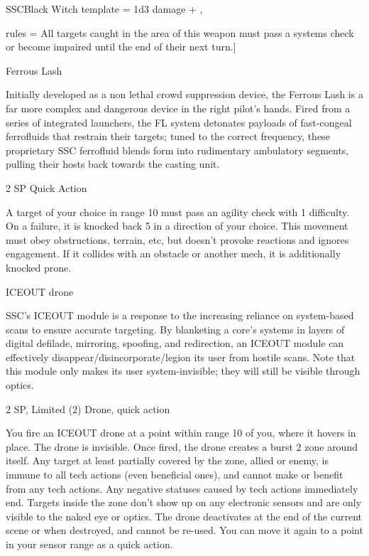 \begin{mech}{SSC}{Black Witch}
template = {\Main \Cannon \linebreak
{} \linebreak
{} \linebreak
1d3 \energy damage + },

rules = {All targets caught in the area of this weapon must pass a systems check or become impaired until the end of their next turn.}]


Ferrous Lash

Initially developed as a non lethal crowd suppression device, the Ferrous Lash is a far more complex and dangerous device in the right pilot's hands. Fired from a series of integrated launchers, the FL system detonates payloads of fast-congeal ferrofluids that restrain their targets; tuned to the correct frequency, these proprietary SSC ferrofluid blends form into rudimentary ambulatory segments, pulling their hosts back towards the casting unit.

2 SP
Quick Action

A target of your choice in range 10 must pass an agility check with 1 difficulty. On a failure, it is knocked back 5 in a direction of your choice. This movement must obey obstructions, terrain, etc, but doesn't provoke reactions and ignores engagement. If it collides with an obstacle or another mech, it is additionally knocked prone.


ICEOUT drone

SSC's ICEOUT module is a response to the increasing reliance on system-based scans to ensure accurate targeting. By blanketing a core's systems in layers of digital defilade, mirroring, spoofing, and redirection, an ICEOUT module can effectively disappear/disincorporate/legion its user from hostile scans. Note that this module only makes its user system-invisible; they will still be visible through optics.

2 SP, Limited (2)
Drone, quick action

You fire an ICEOUT drone at a point within range 10 of you, where it hovers in place. The drone is invisible. Once fired, the drone creates a burst 2 zone around itself. Any target at least partially covered by the zone, allied or enemy, is immune to all tech actions (even beneficial ones), and cannot make or benefit from any tech actions. Any negative statuses caused by tech actions immediately end. Targets inside the zone don't show up on any electronic sensors and are only visible to the naked eye or optics. The drone deactivates at the end of the current scene or when destroyed, and cannot be re-used. You can move it again to a point in your sensor range as a quick action.



\end{mech}
